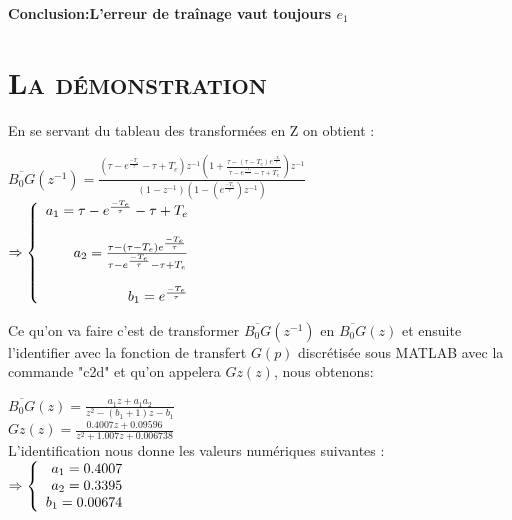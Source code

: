 \textbf{Conclusion:L'erreur de traînage vaut toujours $e_1$}

\section{\textsc{La démonstration}}
\par En se servant du tableau des transformées en Z on obtient :

\begin{center}
	
$\overline{B_0G}(z^{-1}) = \frac{( \tau - e^{\frac{-T_e}{\tau}}-\tau + T_e )z^{-1} ( 1 + \frac{\tau - ( \tau - T_e ) e^{\frac{-T_e}{\tau}}}{\tau - e^{\frac{-T_e}{\tau}}-\tau + T_e} ) z^{-1}} {(1-z^{-1}) (1- ( e^{\frac{-T_e}{\tau}} ) z^{-1})}$\\[0.25 cm]
	
	$ \Rightarrow \left \{
   \begin{array}{r c l}
      a_1  = \tau - e^{\frac{-T_e}{\tau}}-\tau + T_e \\\\
      a_2 =  \frac{\tau - ( \tau - T_e ) e^{\frac{-T_e}{\tau}}}{\tau - e^{\frac{-T_e}{\tau}}-\tau + T_e} \\\\
      b_1 = e^{\frac{-T_e}{\tau}}
   \end{array}
   \right . $
			
\end{center}


\par Ce qu'on va faire c'est de transformer $\overline{B_0G}(z^{-1})$ en $\overline{B_0G}(z)$ et ensuite l'identifier avec la fonction de transfert $G(p)$ discrétisée sous MATLAB avec la commande "c2d" et qu'on appelera $Gz(z)$, nous obtenons:

	\begin{center}
	 		
			$\overline{B_0G}(z)= \frac{a_1 z + a_1a_2}{z^2 -(b_1+1)z-b_1} $ \\[0.25cm]
			$Gz(z)= \frac{0.4007 z+ 0.09596}{z^2 + 1.007 z+ 0.006738} $\\[0.25cm]
			L'identification nous donne les valeurs numériques suivantes : $\Rightarrow 
	 \left \{
   \begin{array}{r c l}
      a_1 = 0.4007 \\
      a_2 =   0.3395\\
      b_1 = 0.00674
   \end{array}
   \right . $
	\end{center}
  
